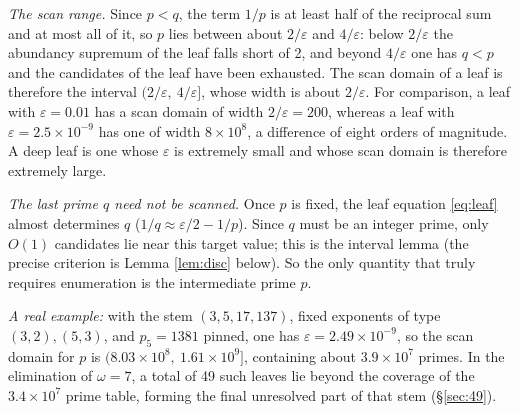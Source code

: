 \documentclass[11pt]{article}
\theoremstyle{remark}
\begin{document}
\emph{The scan range.} Since $p < q$, the term $1/p$ is at least half of the reciprocal sum and at most all of it, so $p$ lies between about $2/\varepsilon$ and $4/\varepsilon$: below $2/\varepsilon$ the abundancy supremum of the leaf falls short of 2, and beyond $4/\varepsilon$ one has $q < p$ and the candidates of the leaf have been exhausted. The scan domain of a leaf is therefore the interval $(2/\varepsilon,\ 4/\varepsilon]$, whose width is about $2/\varepsilon$. For comparison, a leaf with $\varepsilon = 0.01$ has a scan domain of width $2/\varepsilon = 200$, whereas a leaf with $\varepsilon = 2.5 \times 10^{-9}$ has one of width $8 \times 10^8$, a difference of eight orders of magnitude. A deep leaf is one whose $\varepsilon$ is extremely small and whose scan domain is therefore extremely large.

\emph{The last prime $q$ need not be scanned.} Once $p$ is fixed, the leaf equation \eqref{eq:leaf} almost determines $q$ ($1/q \approx \varepsilon/2 - 1/p$). Since $q$ must be an integer prime, only $O(1)$ candidates lie near this target value; this is the interval lemma (the precise criterion is Lemma \ref{lem:disc} below). So the only quantity that truly requires enumeration is the intermediate prime $p$.

\emph{A real example:} with the stem $(3, 5, 17, 137)$, fixed exponents of type $(3,2),(5,3)$, and $p_5 = 1381$ pinned, one has $\varepsilon = 2.49 \times 10^{-9}$, so the scan domain for $p$ is $(8.03 \times 10^8,\ 1.61 \times 10^9]$, containing about $3.9 \times 10^7$ primes. In the elimination of $\omega = 7$, a total of 49 such leaves lie beyond the coverage of the $3.4 \times 10^7$ prime table, forming the final unresolved part of that stem (\S\ref{sec:49}).
\end{document}
